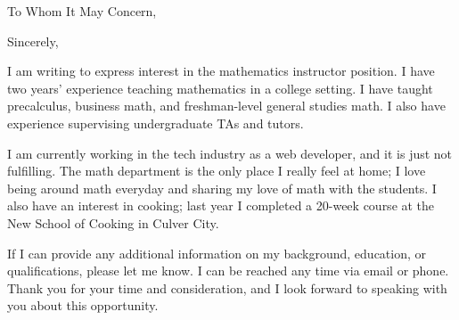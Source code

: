 \documentclass[11pt,a4paper,sans]{moderncv}        %
\begin{document}
\date{November 24, 2015}
\opening{To Whom It May Concern,}
\closing{Sincerely,}
\makelettertitle

I am writing to express interest in the mathematics instructor position. I have two years' experience teaching mathematics in a college setting. I have taught precalculus, business math, and freshman-level general studies math. I also have experience supervising undergraduate TAs and tutors.

I am currently working in the tech industry as a web developer, and it is just not fulfilling. The math department is the only place I really feel at home; I love being around math everyday and sharing my love of math with the students. %
I also have an interest in cooking; last year I completed a 20-week course at the New School of Cooking in Culver City.

If I can provide any additional information on my background, education,  or qualifications, please let me know. I can be reached any time via email or phone. Thank you for your time and consideration, and I look forward to speaking with you about this opportunity.\\

~\\~\\

\makeletterclosing
\end{document}
